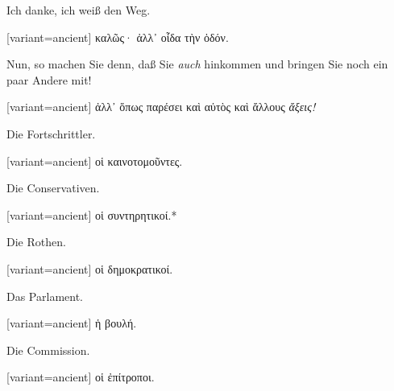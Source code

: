 Ich danke, ich weiß den Weg.

\switchcolumn

\begin{greek}[variant=ancient]%
καλῶς· ἀλλ᾽ οἶδα τὴν ὁδόν.

\end{greek}%
\switchcolumn*

Nun, so machen Sie denn, daß Sie \emph{auch} hinkommen und bringen
Sie noch ein paar Andere mit!

\switchcolumn

\begin{greek}[variant=ancient]%
ἀλλ᾽ ὅπως παρέσει καὶ αὐτὸς καὶ ἄλλους \emph{ἄξεις!}

\end{greek}%
\switchcolumn*

Die Fort\textcompwordmark{}schrittler.

\switchcolumn

\begin{greek}[variant=ancient]%
οἱ καινοτομοῦντες.

\end{greek}%
\switchcolumn*

Die Conservativen.

\switchcolumn

\begin{greek}[variant=ancient]%
οἱ συντηρητικοί.{*}

\end{greek}%
\switchcolumn*

Die Rothen.

\switchcolumn

\begin{greek}[variant=ancient]%
οἱ δημοκρατικοί.

\end{greek}%
\switchcolumn*

Das Parlament.

\switchcolumn

\begin{greek}[variant=ancient]%
ἡ βουλή.

\end{greek}%
\switchcolumn*

Die Commission.

\switchcolumn

\begin{greek}[variant=ancient]%
οἱ ἐπίτροποι.

\end{greek}%
\switchcolumn*

